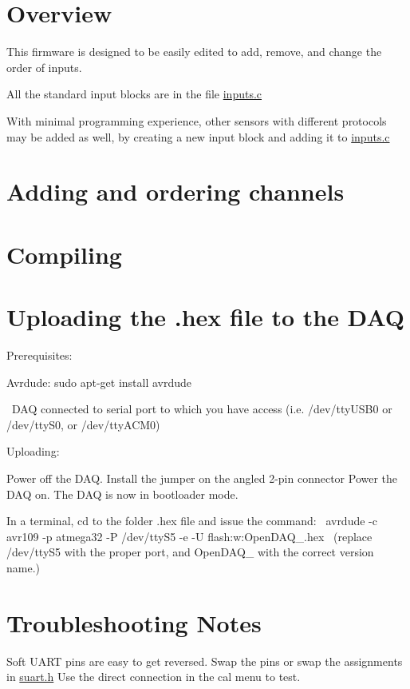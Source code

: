 \hypertarget{index_Overview}{}\section{Overview}\label{index_Overview}
This firmware is designed to be easily edited to add, remove, and change the order of inputs.\par
All the standard input blocks are in the file \hyperlink{inputs_8c}{inputs.\-c} \par
With minimal programming experience, other sensors with different protocols may be added as well, by creating a new input block and adding it to \hyperlink{inputs_8c}{inputs.\-c} \par
\hypertarget{index_two}{}\section{Adding and ordering channels}\label{index_two}
 \hypertarget{index_three}{}\section{Compiling}\label{index_three}
 \hypertarget{index_four}{}\section{Uploading the .\-hex file to the D\-A\-Q}\label{index_four}
Prerequisites\-: \par
 
\begin{DoxyItemize}
\item Avrdude\-: sudo apt-\/get install avrdude \par
  
\item ~D\-A\-Q connected to serial port to which you have access (i.\-e. /dev/tty\-U\-S\-B0 or /dev/tty\-S0, or /dev/tty\-A\-C\-M0) \par
  
\end{DoxyItemize}Uploading\-:\par
 
\begin{DoxyItemize}
\item Power off the D\-A\-Q. Install the jumper on the angled 2-\/pin connector Power the D\-A\-Q on. The D\-A\-Q is now in bootloader mode. 
\item In a terminal, cd to the folder .hex file and issue the command\-:~  avrdude -\/c avr109 -\/p atmega32 -\/\-P /dev/tty\-S5 -\/e -\/\-U flash\-:w\-:Open\-D\-A\-Q\-\_.\-hex~ (replace /dev/tty\-S5 with the proper port, and Open\-D\-A\-Q\-\_ with the correct version name.)  
\end{DoxyItemize}\hypertarget{index_fourptfive}{}\section{Troubleshooting Notes}\label{index_fourptfive}
Soft U\-A\-R\-T pins are easy to get reversed. Swap the pins or swap the assignments in \hyperlink{suart_8h}{suart.\-h} Use the direct connection in the cal menu to test.

